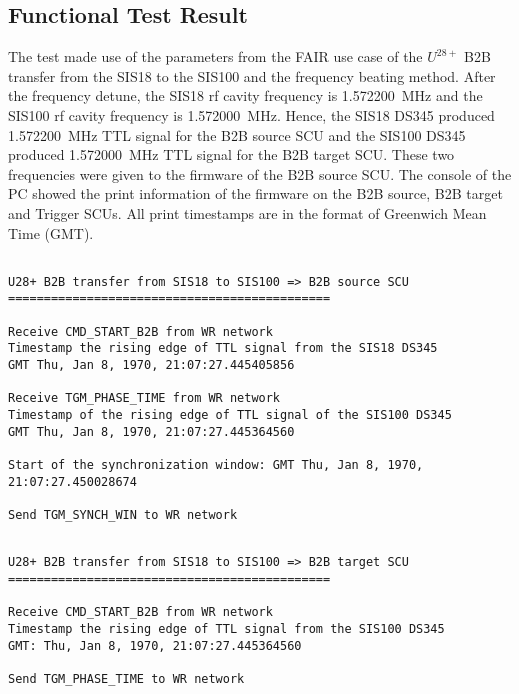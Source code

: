 \subsection{Functional Test Result}
\label{sec:function_result}
The test made use of the parameters from the FAIR use case of the $U^{28+}$ B2B transfer from the SIS18 to the SIS100 and the frequency beating method. After the frequency detune, the SIS18 rf cavity frequency is \SI{1.572200}{\MHz} and the SIS100 rf cavity frequency is \SI{1.572000}{\MHz}. Hence, the SIS18 DS345 produced \SI{1.572200}{\MHz} TTL signal for the B2B source SCU and the SIS100 DS345 produced \SI{1.572000}{\MHz} TTL signal for the B2B target SCU. These two frequencies were given to the firmware of the B2B source SCU. The console of the PC showed the print information of the firmware on the B2B source, B2B target and Trigger SCUs. All print timestamps are in the format of Greenwich Mean Time (GMT). 
\begin{lstlisting}[language={[ANSI]C}, keywordstyle=\color{blue!70}, commentstyle=\color{red!50!green!50!blue!50}, frame=shadowbox, rulesepcolor=\color{red!20!green!20!blue!20}]

U28+ B2B transfer from SIS18 to SIS100 => B2B source SCU
=============================================

Receive CMD_START_B2B from WR network
Timestamp the rising edge of TTL signal from the SIS18 DS345 
GMT Thu, Jan 8, 1970, 21:07:27.445405856

Receive TGM_PHASE_TIME from WR network
Timestamp of the rising edge of TTL signal of the SIS100 DS345 
GMT Thu, Jan 8, 1970, 21:07:27.445364560

Start of the synchronization window: GMT Thu, Jan 8, 1970, 21:07:27.450028674

Send TGM_SYNCH_WIN to WR network
\end{lstlisting}

\begin{lstlisting}[language={[ANSI]C}, keywordstyle=\color{blue!70}, commentstyle=\color{red!50!green!50!blue!50}, frame=shadowbox, rulesepcolor=\color{red!20!green!20!blue!20}]

U28+ B2B transfer from SIS18 to SIS100 => B2B target SCU
=============================================

Receive CMD_START_B2B from WR network
Timestamp the rising edge of TTL signal from the SIS100 DS345 
GMT: Thu, Jan 8, 1970, 21:07:27.445364560

Send TGM_PHASE_TIME to WR network
\end{lstlisting}

